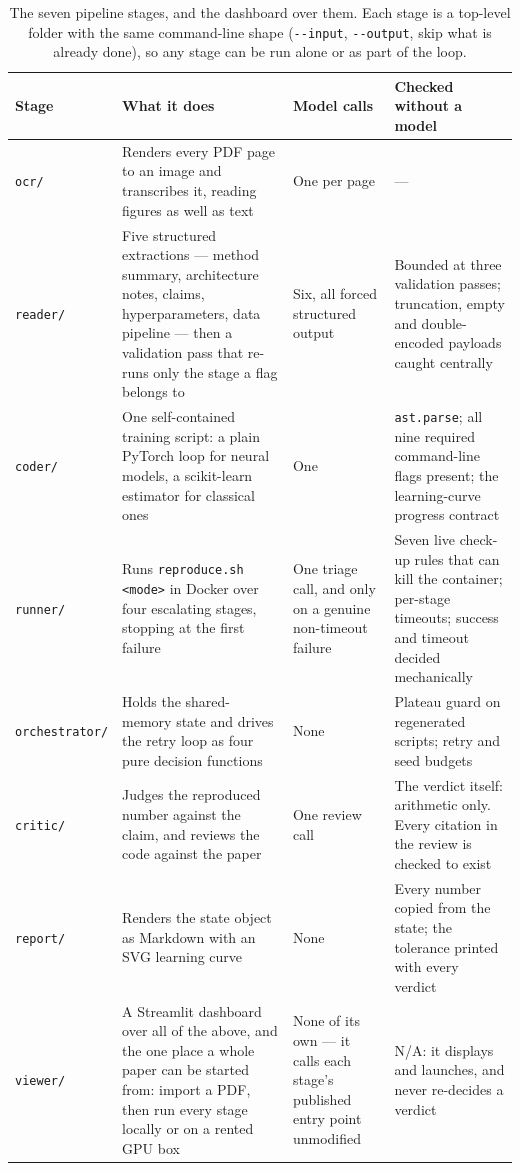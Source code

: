 \documentclass[11pt]{article}
\newcommand{\squeeze}{\setlength{\tabcolsep}{4pt}}
\begin{document}
\begin{table}[tbp]
\centering
\small
\caption{The seven pipeline stages, and the dashboard over them. Each stage is a top-level folder
with the same command-line shape (\texttt{-{}-input}, \texttt{-{}-output}, skip what is already
done), so any stage can be run alone or as part of the loop.}
\label{tab:stages}
\squeeze
\begin{tabular}{L{0.16\textwidth}L{0.28\textwidth}L{0.21\textwidth}L{0.25\textwidth}}
\toprule
Stage & What it does & Model calls & Checked without a model \\
\midrule
\texttt{ocr/} & Renders every PDF page to an image and transcribes it, reading figures as well
  as text & One per page & --- \\
\texttt{reader/} & Five structured extractions --- method summary, architecture notes, claims,
  hyperparameters, data pipeline --- then a validation pass that re-runs only the stage a flag
  belongs to & Six, all forced structured output & Bounded at three validation passes;
  truncation, empty and double-encoded payloads caught centrally \\
\texttt{coder/} & One self-contained training script: a plain PyTorch loop for neural models, a
  scikit-learn estimator for classical ones & One & \texttt{ast.parse}; all nine required
  command-line flags present; the learning-curve progress contract \\
\texttt{runner/} & Runs \texttt{reproduce.sh <mode>} in Docker over four escalating stages,
  stopping at the first failure & One triage call, and only on a genuine non-timeout failure &
  Seven live check-up rules that can kill the container; per-stage timeouts; success and timeout
  decided mechanically \\
\texttt{orchestrator/} & Holds the shared-memory state and drives the retry loop as four pure
  decision functions & None & Plateau guard on regenerated scripts; retry and seed budgets \\
\texttt{critic/} & Judges the reproduced number against the claim, and reviews the code against
  the paper & One review call & The verdict itself: arithmetic only. Every citation in the review
  is checked to exist \\
\texttt{report/} & Renders the state object as Markdown with an SVG learning curve & None & Every
  number copied from the state; the tolerance printed with every verdict \\
\midrule
\texttt{viewer/} & A Streamlit dashboard over all of the above, and the one place a whole paper
  can be started from: import a PDF, then run every stage locally or on a rented GPU box &
  None of its own --- it calls each stage's published entry point unmodified & N/A: it displays
  and launches, and never re-decides a verdict \\
\bottomrule
\end{tabular}
\end{table}
\end{document}
